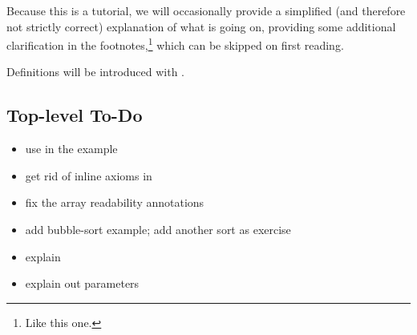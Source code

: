   Because this is a tutorial, we will occasionally provide a simplified (and
  therefore not strictly correct) explanation of what is going on, providing
  some additional clarification in the footnotes,\footnote{Like this one.}
  which can be skipped on first reading.

  Definitions will be introduced with .

\subsection{Top-level To-Do}

\begin{itemize}
\item use \vcc{\old} in the  example
\item get rid of inline axioms in 
\item fix the  array readability annotations
\item add bubble-sort example; add another sort as exercise
\item explain \vcc{\at()}
\item explain out parameters
\end{itemize}

